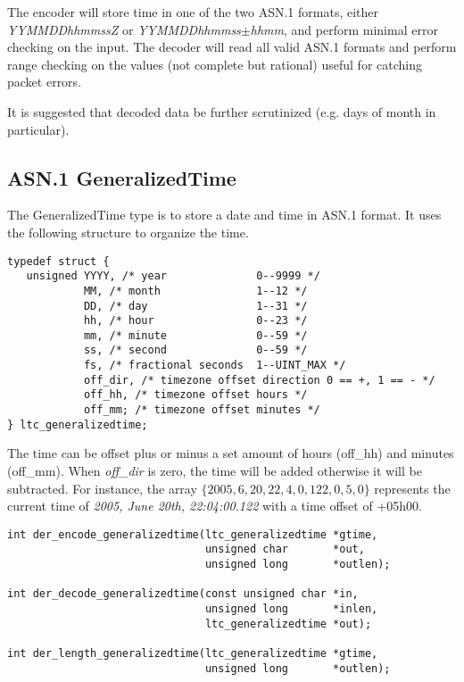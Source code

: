 \documentclass[synpaper]{book}
\begin{document}
The encoder will store time in one of the two ASN.1 formats, either \textit{YYMMDDhhmmssZ} or \textit{YYMMDDhhmmss$\pm$hhmm}, and perform minimal error checking on the
input.  The decoder will read all valid ASN.1 formats and perform range checking on the values (not complete but rational) useful for catching packet errors.

It is suggested that decoded data be further scrutinized (e.g. days of month in particular).

\subsection{ASN.1 GeneralizedTime}

The GeneralizedTime type is to store a date and time in ASN.1 format.  It uses the following structure to organize the time.

\begin{verbatim}
typedef struct {
   unsigned YYYY, /* year              0--9999 */
            MM, /* month               1--12 */
            DD, /* day                 1--31 */
            hh, /* hour                0--23 */
            mm, /* minute              0--59 */
            ss, /* second              0--59 */
            fs, /* fractional seconds  1--UINT_MAX */
            off_dir, /* timezone offset direction 0 == +, 1 == - */
            off_hh, /* timezone offset hours */
            off_mm; /* timezone offset minutes */
} ltc_generalizedtime;
\end{verbatim}

The time can be offset plus or minus a set amount of hours (off\_hh) and minutes (off\_mm).  When \textit{off\_dir} is zero, the time will be added otherwise it
will be subtracted.  For instance, the array $\lbrace 2005, 6, 20, 22, 4, 0, 122, 0, 5, 0 \rbrace$ represents the current time of
\textit{2005, June 20th, 22:04:00.122} with a time offset of +05h00.

\begin{verbatim}
int der_encode_generalizedtime(ltc_generalizedtime *gtime,
                               unsigned char       *out,
                               unsigned long       *outlen);

int der_decode_generalizedtime(const unsigned char *in,
                               unsigned long       *inlen,
                               ltc_generalizedtime *out);

int der_length_generalizedtime(ltc_generalizedtime *gtime,
                               unsigned long       *outlen);
\end{verbatim}
\end{document}
